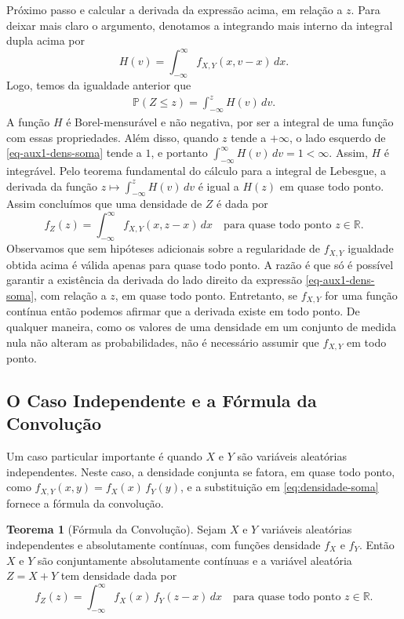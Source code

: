 \documentclass[12pt,portuguese]{article}
\theoremstyle{definition}
\newtheorem{theorem}{Teorema}
\theoremstyle{plainexercise}
\theoremstyle{starredexercise}
\theoremstyle{definition}
\begin{document}
Próximo passo e calcular a derivada da expressão acima, em relação a $z$. 
Para deixar mais claro o argumento, denotamos a integrando mais interno da integral
dupla acima por
\[
  H(v) = \int_{-\infty}^{\infty} f_{X,Y}(x, v-x)\,dx.
\]
Logo, temos da igualdade anterior que
\begin{align}\label{eq-aux1-dens-soma}
  \mathbb{P}(Z \leqslant z) = \int_{-\infty}^{z} H(v)\,dv.
\end{align}
A função $H$ é Borel-mensurável e não negativa, por ser a integral de uma
função com essas propriedades. Além disso, quando $z$ tende a $+\infty$, o lado
esquerdo de \eqref{eq-aux1-dens-soma} tende a $1$, e portanto $\int_{-\infty}^{\infty} H(v)\,dv = 1 <
\infty$. Assim, $H$ é integrável. Pelo teorema fundamental do cálculo para a
integral de Lebesgue, a derivada da função $z \mapsto \int_{-\infty}^{z}
H(v)\,dv$ é igual a $H(z)$ em quase todo ponto. Assim concluímos que uma densidade de
$Z$ é dada por
\begin{equation}\label{eq:densidade-soma}
  f_Z(z) = \int_{-\infty}^{\infty} f_{X,Y}(x, z-x)\,dx
  \quad \text{para quase todo ponto } z \in \mathbb{R}.
\end{equation}
Observamos que sem hipóteses adicionais
sobre a regularidade de $f_{X,Y}$ igualdade obtida acima é válida apenas 
para quase todo ponto. 
A razão é que só é possível garantir a existência da derivada do lado direito da
expressão \eqref{eq-aux1-dens-soma}, com relação a $z$, em quase todo ponto. 
Entretanto, se $f_{X,Y}$ for uma função contínua então podemos afirmar que a derivada
existe em todo ponto. 
De qualquer maneira, como os valores de uma densidade em um conjunto 
de medida nula não alteram as probabilidades, não é necessário
assumir que $f_{X,Y}$ em todo ponto.

\subsection{O Caso Independente e a Fórmula da Convolução}\label{subsec:formula-convolucao}
Um caso particular importante é quando $X$ e $Y$ são variáveis aleatórias independentes. 
Neste caso, a densidade conjunta se fatora, em quase todo ponto, como $f_{X,Y}(x, y) =
f_X(x)\,f_Y(y)$, e a substituição em \eqref{eq:densidade-soma} fornece a
fórmula da convolução.

\begin{theorem}[Fórmula da Convolução]\label{thm:formula-convolucao}
  Sejam $X$ e $Y$ variáveis aleatórias independentes e absolutamente contínuas,
  com funções densidade $f_X$ e $f_Y$. Então $X$ e $Y$ são conjuntamente
  absolutamente contínuas e a variável aleatória $Z = X + Y$ tem densidade
  dada por
  \begin{equation}\label{eq:convolucao}
    f_Z(z) = \int_{-\infty}^{\infty} f_X(x)\,f_Y(z - x)\,dx
    \quad \text{para quase todo ponto } z \in \mathbb{R}.
  \end{equation}
\end{theorem}
\end{document}
